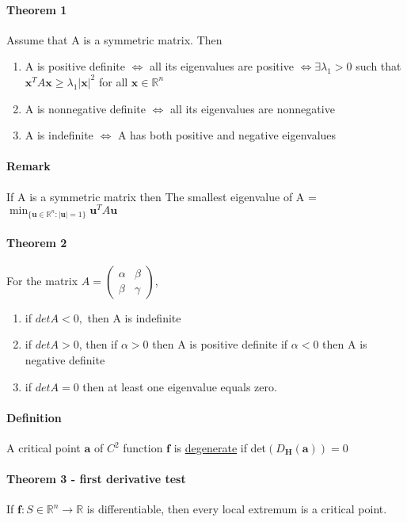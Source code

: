 \documentclass[11pt]{article}
\newcommand{\tb}[1]{\textbf{#1}}
\newcommand{\real}[0]{\mathbb{R}}
\newcommand{\under}[1]{\underline{#1}}
\begin{document}
\paragraph{Theorem 1} Assume that A is a symmetric matrix. Then \newline
\begin{enumerate}
    \item A is positive definite $\iff$ all its eigenvalues are positive \newline
$\iff \exists \lambda_1 > 0$ such that $\tb{x}^TA\tb{x} \geq \lambda_1|\tb{x}|^2$ for all $\tb{x} \in \real^n $
    \item A is nonnegative definite $\iff$ all its eigenvalues are nonnegative \newline
    \item A is indefinite $\iff$ A has both positive and negative eigenvalues
\end{enumerate}
\paragraph{Remark} If A is a symmetric matrix then \newline
The smallest eigenvalue of A = $\min_{\{\tb{u}\in \real^n: |\tb{u}| = 1\}} \tb{u}^TA\tb{u}$
\paragraph{Theorem 2} For the matrix $A = \begin{pmatrix}
    \alpha & \beta \\
    \beta & \gamma 
\end{pmatrix}$,
\begin{enumerate}
    \item if $det A < 0,$ then A is indefinite
    \item if $det A > 0$, then
    \subitem if $\alpha > 0$ then A is positive definite
    \subitem if $\alpha < 0$ then A is negative definite
    \item if $det A = 0$ then at least one eigenvalue equals zero.
\end{enumerate}
\paragraph{Definition} A critical point $\tb{a}$ of $C^2$ function $\tb{f}$ is \under{degenerate} if det$(D_\tb{H}(\tb{a})) = 0$
\paragraph{Theorem 3 - first derivative test} If $\tb{f}: S \in \real^n \rightarrow \real$ is differentiable, then every local extremum is a critical point.
\end{document}
